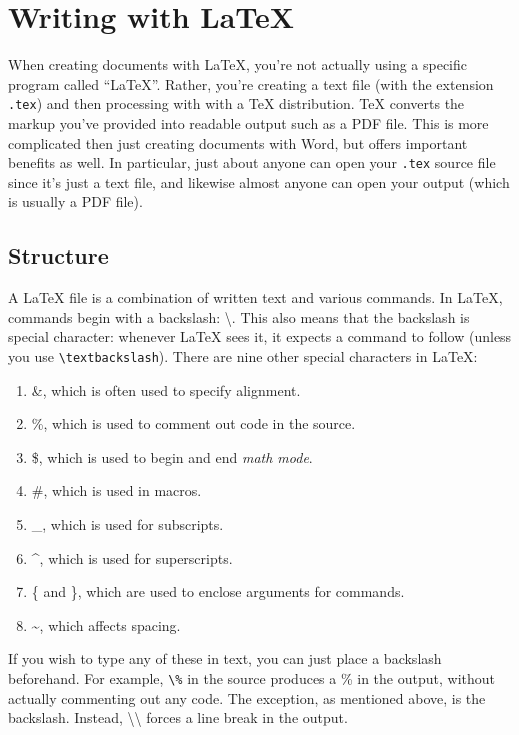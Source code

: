 \documentclass{article}
\begin{document}
\section{Writing with \LaTeX}

When creating documents with \LaTeX{}, you're not actually using a specific program called ``\LaTeX{}''.
Rather, you're creating a text file (with the extension \texttt{.tex}) and then processing with with a \TeX{} distribution.
\TeX{} converts the markup you've provided into readable output such as a PDF file.
This is more complicated then just creating documents with Word, but offers important benefits as well.
In particular, just about anyone can open your \texttt{.tex} source file since it's just a text file, and likewise almost anyone can open your output (which is usually a PDF file).

\subsection{Structure}

A \LaTeX{} file is a combination of written text and various commands.
In \LaTeX, commands begin with a backslash: \textbackslash.
This also means that the backslash is special character: whenever \LaTeX{} sees it, it expects a command to follow (unless you use \texttt{\textbackslash textbackslash}).
There are nine other special characters in \LaTeX:
\begin{enumerate}
    \item \&, which is often used to specify alignment.
    \item \%, which is used to comment out code in the source.
    \item \$, which is used to begin and end \textit{math mode}.
    \item \#, which is used in macros.
    \item \_, which is used for subscripts.
    \item \^{}, which is used for superscripts.
    \item \{ and \}, which are used to enclose arguments for commands.
    \item \~{}, which affects spacing.
\end{enumerate}
If you wish to type any of these in text, you can just place a backslash beforehand.
For example, \texttt{\textbackslash \%} in the source produces a \% in the output, without actually commenting out any code.
The exception, as mentioned above, is the backslash.
Instead, \textbackslash\textbackslash{} forces a line break in the output.
\end{document}
